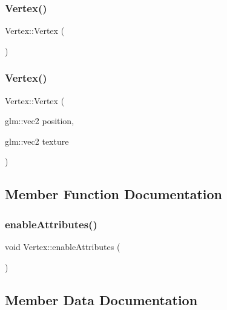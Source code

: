 \subsubsection{\texorpdfstring{Vertex()}{Vertex()}\hspace{0.1cm}{\footnotesize\ttfamily [1/2]}}
{\footnotesize\ttfamily Vertex\+::\+Vertex (\begin{DoxyParamCaption}{ }\end{DoxyParamCaption})}

\mbox{\label{struct_vertex_a4ece5be7303fde1e77f2330250aeb2b4}} 
\subsubsection{\texorpdfstring{Vertex()}{Vertex()}\hspace{0.1cm}{\footnotesize\ttfamily [2/2]}}
{\footnotesize\ttfamily Vertex\+::\+Vertex (\begin{DoxyParamCaption}\item[{glm\+::vec2}]{position,  }\item[{glm\+::vec2}]{texture }\end{DoxyParamCaption})}



\subsection{Member Function Documentation}
\mbox{\label{struct_vertex_a537a49ecadd79e80bc6d2715c7dd2d0f}} 
\subsubsection{\texorpdfstring{enable\+Attributes()}{enableAttributes()}}
{\footnotesize\ttfamily void Vertex\+::enable\+Attributes (\begin{DoxyParamCaption}{ }\end{DoxyParamCaption})\hspace{0.3cm}{\ttfamily [static]}}



\subsection{Member Data Documentation}
\mbox{\label{struct_vertex_a5efee132fdc7e4f47cba4dc51713d12a}} 
